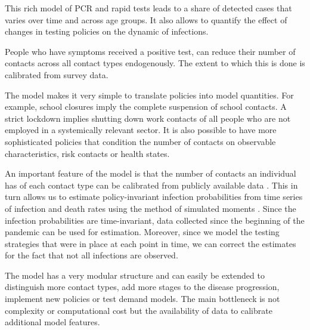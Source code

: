 This rich model of PCR and rapid tests leads to a share of detected cases that varies
over time and across age groups. It also allows to quantify the effect of changes in
testing policies on the dynamic of infections.

People who have symptoms received a positive test,
 can reduce their number of contacts across all
contact types endogenously. The extent to which this is done is calibrated from survey
data.

The model makes it very simple to translate policies into model quantities. For example,
school closures imply the complete suspension of school contacts. A strict lockdown
implies shutting down work contacts of all people who are not employed in a systemically
relevant sector. It is also possible to have more sophisticated policies that condition
the number of contacts on observable characteristics, risk contacts or health states.

An important feature of the model is that the number of contacts an individual has of
each contact type can be calibrated from publicly available data \citep{Mossong2008}.
This in turn allows us to estimate policy-invariant infection probabilities from time
series of infection and death rates using the method of simulated moments
\citep{McFadden1989}. Since the infection probabilities are time-invariant, data
collected since the beginning of the pandemic can be used for estimation. Moreover,
since we model the testing strategies that were in place at each point in time, we can
correct the estimates for the fact that not all infections are observed.

The model has a very modular structure and can easily be extended to distinguish more
contact types, add more stages to the disease progression, implement new policies
or test demand models. The main bottleneck is not complexity or computational cost
but the availability of data to calibrate additional model features.

